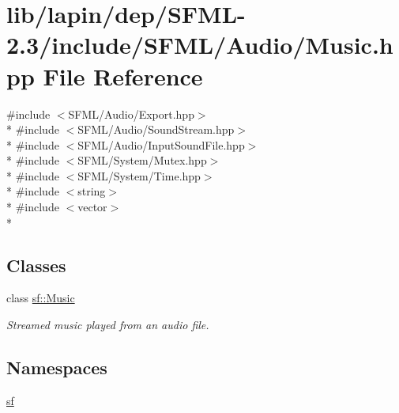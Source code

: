 \hypertarget{lapin_2dep_2_s_f_m_l-2_83_2include_2_s_f_m_l_2_audio_2_music_8hpp}{\section{lib/lapin/dep/\-S\-F\-M\-L-\/2.3/include/\-S\-F\-M\-L/\-Audio/\-Music.hpp File Reference}
\label{lapin_2dep_2_s_f_m_l-2_83_2include_2_s_f_m_l_2_audio_2_music_8hpp}
}
{\ttfamily \#include $<$S\-F\-M\-L/\-Audio/\-Export.\-hpp$>$}\\*
{\ttfamily \#include $<$S\-F\-M\-L/\-Audio/\-Sound\-Stream.\-hpp$>$}\\*
{\ttfamily \#include $<$S\-F\-M\-L/\-Audio/\-Input\-Sound\-File.\-hpp$>$}\\*
{\ttfamily \#include $<$S\-F\-M\-L/\-System/\-Mutex.\-hpp$>$}\\*
{\ttfamily \#include $<$S\-F\-M\-L/\-System/\-Time.\-hpp$>$}\\*
{\ttfamily \#include $<$string$>$}\\*
{\ttfamily \#include $<$vector$>$}\\*
\subsection*{Classes}
\begin{DoxyCompactItemize}
\item 
class \hyperlink{classsf_1_1_music}{sf\-::\-Music}
\begin{DoxyCompactList}\small\item\em Streamed music played from an audio file. \end{DoxyCompactList}\end{DoxyCompactItemize}
\subsection*{Namespaces}
\begin{DoxyCompactItemize}
\item 
\hyperlink{namespacesf}{sf}
\end{DoxyCompactItemize}
